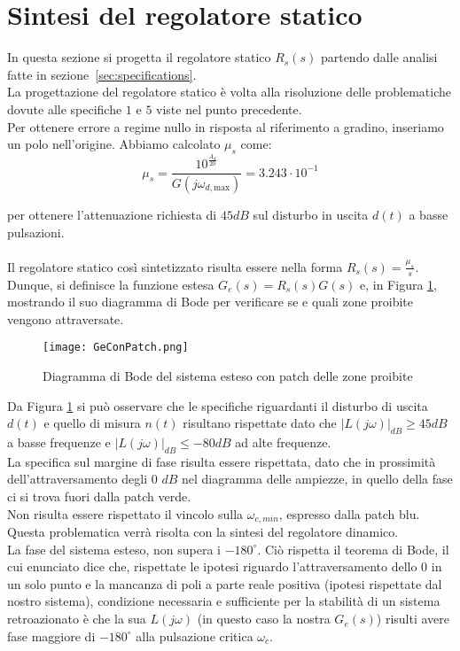\documentclass[a4paper, 11pt]{article}
\begin{document}
\clearpage
\section{Sintesi del regolatore statico}
\label{sec:static_regulator}


In questa sezione si progetta il regolatore statico $R_s(s)$ partendo dalle analisi fatte in sezione~\ref{sec:specifications}.\\
La progettazione del regolatore statico è volta alla risoluzione delle problematiche dovute alle specifiche $1$ e $5$ viste nel punto precedente.\\
Per ottenere errore a regime nullo in risposta al riferimento a gradino, inseriamo un polo nell'origine. 
Abbiamo calcolato $\mu_s$ come:
\begin{equation}
    \mu_s = \frac{10^{\frac{A_d}{20}}}{G(j\omega_{d,\text{max}})} =  3.243 \cdot 10^{-1}
\end{equation}

per ottenere l'attenuazione richiesta di $45dB$ sul disturbo in uscita $d(t)$ a basse pulsazioni.
\\
\\
Il regolatore statico così sintetizzato risulta essere nella forma $R_s(s)=\frac{\mu_s}{s}$.\\

Dunque, si definisce la funzione estesa $G_e(s) = R_s(s)G(s)$ e, in Figura \ref{geconpatch}, mostrando il suo diagramma di Bode per verificare se e quali zone proibite vengono attraversate.

\begin{figure}[h!]
    \centering
    \texttt{[image: GeConPatch.png]}
    \caption{Diagramma di Bode del sistema esteso con patch delle zone proibite}
    \label{geconpatch}
\end{figure}


Da Figura \ref{geconpatch} si può osservare che le specifiche riguardanti il disturbo di uscita $d(t)$ e quello di misura $n(t)$ risultano rispettate dato che $|L(j\omega)|_{dB}\ge45dB$ a basse frequenze e $|L(j\omega)|_{dB}\le-80dB$ ad alte frequenze. \\
La specifica sul margine di fase risulta essere rispettata, dato che in prossimità dell'attraversamento degli $0$ $dB$ nel diagramma delle ampiezze, in quello della fase ci si trova fuori dalla patch verde. \\
Non risulta essere rispettato il vincolo sulla $\omega_{c,min}$, espresso dalla patch blu. Questa problematica verrà risolta con la sintesi del regolatore dinamico. \\
La fase del sistema esteso, non supera i $-180^{\circ}$. Ciò rispetta il teorema di Bode, il cui enunciato dice che, rispettate le ipotesi riguardo l'attraversamento dello 0 in un solo punto e la mancanza di poli a parte reale positiva (ipotesi rispettate dal nostro sistema), condizione necessaria e sufficiente per la stabilità di un sistema retroazionato è che la sua $L(j\omega)$ (in questo caso la nostra $G_e(s)$) risulti avere fase maggiore di $-180^{\circ}$ alla pulsazione critica $\omega_c$. \\
\end{document}
